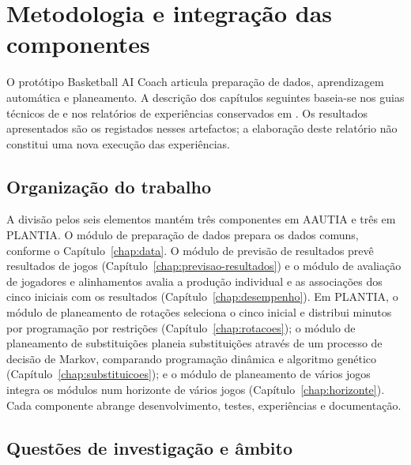 \chapter{Metodologia e integração das componentes}
\label{chap:metodologia}

O protótipo Basketball AI Coach articula preparação de dados, aprendizagem
automática e planeamento. A descrição dos capítulos seguintes baseia-se nos
guias técnicos de  e nos relatórios de experiências
conservados em . Os resultados apresentados
são os registados nesses artefactos; a elaboração deste relatório não
constitui uma nova execução das experiências.

\section{Organização do trabalho}

A divisão pelos seis elementos mantém três componentes em AAUTIA e três
em PLANTIA. O módulo de preparação de dados prepara os dados comuns, conforme o
Capítulo~\ref{chap:data}. O módulo de previsão de resultados prevê resultados de jogos
(Capítulo~\ref{chap:previsao-resultados}) e o módulo de avaliação de jogadores e alinhamentos avalia a produção
individual e as associações dos cinco iniciais com os resultados
(Capítulo~\ref{chap:desempenho}). Em PLANTIA, o módulo de planeamento de rotações seleciona o cinco
inicial e distribui minutos por programação por restrições
(Capítulo~\ref{chap:rotacoes}); o módulo de planeamento de substituições planeia substituições através
de um processo de decisão de Markov, comparando programação dinâmica e
algoritmo genético (Capítulo~\ref{chap:substituicoes}); e
o módulo de planeamento de vários jogos integra os módulos num horizonte de vários jogos
(Capítulo~\ref{chap:horizonte}). Cada componente abrange desenvolvimento,
testes, experiências e documentação.

\section{Questões de investigação e âmbito}

